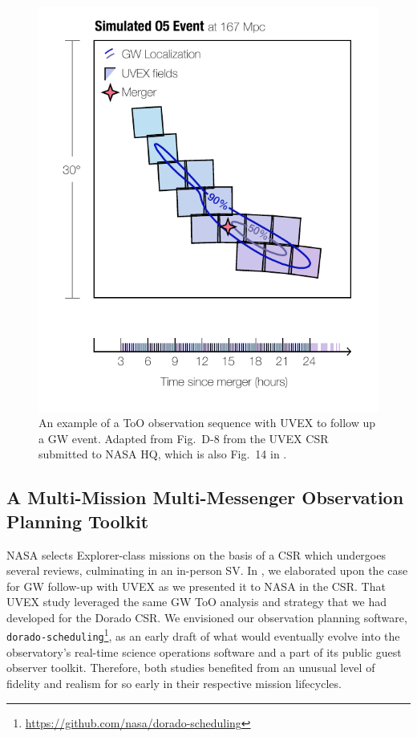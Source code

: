 \documentclass[twocolumn,times]{aastex631}
\begin{document}
\begin{figure}
    \includegraphics[width=\columnwidth]{figures/uvex-tiling}
    \caption{\label{fig:uvex-tiling}An example of a \ac{ToO} observation sequence with \ac{UVEX} to follow up a \ac{GW} event. Adapted from Fig.~D-8 from the \ac{UVEX} \ac{CSR} submitted to NASA \ac{HQ}, which is also Fig.~14 in \citet{2021arXiv211115608K}.}
\end{figure}

\subsection{A Multi-Mission Multi-Messenger Observation Planning Toolkit}

NASA selects Explorer-class missions on the basis of a \acf{CSR} which undergoes several reviews, culminating in an in-person \ac{SV}. In \citet{2025arXiv250114109C}, we elaborated upon the case for \ac{GW} follow-up with \ac{UVEX} as we presented it to NASA in the \ac{CSR}. That \ac{UVEX} study leveraged the same \ac{GW} \ac{ToO} analysis and strategy that we had developed for the Dorado \ac{CSR}. We envisioned our observation planning software, \texttt{dorado-scheduling}\footnote{\url{https://github.com/nasa/dorado-scheduling}}, as an early draft of what would eventually evolve into the observatory's real-time science operations software and a part of its public guest observer toolkit. Therefore, both studies benefited from an unusual level of fidelity and realism for so early in their respective mission lifecycles.
\end{document}
